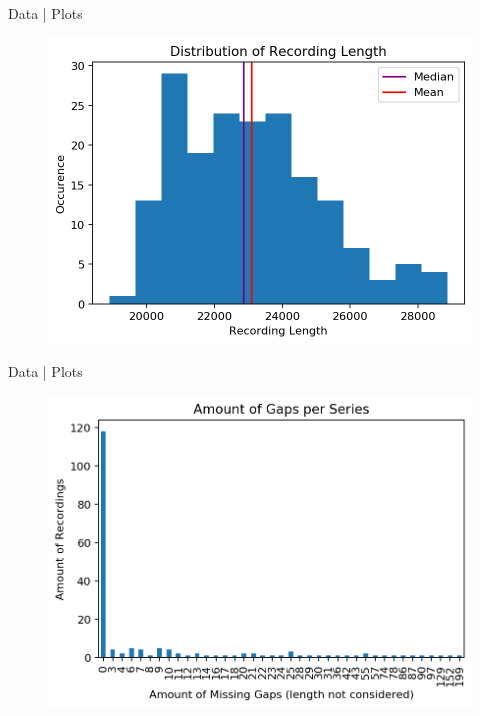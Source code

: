 \documentclass{beamer}
\begin{document}
    \begin{frame}{Data | Plots}
        \begin{figure}[hbt]
        	\center
        	\includegraphics[width=1.0\textwidth]{img/record_length.png}
        	\label{fig:record_length}
        \end{figure}
    \end{frame}
    
    \begin{frame}{Data | Plots}
        \begin{figure}[hbt]
        	\center
        	\includegraphics[width=1.0\textwidth]{img/gaps.png}
        	\label{fig:gaps}
        \end{figure}
    \end{frame}
    
\end{document}
